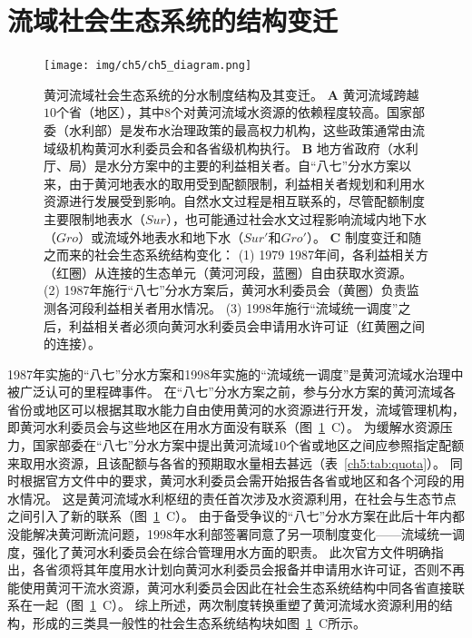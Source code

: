 
\section{流域社会\textendash{}生态系统的结构变迁}\label{results-1}

\begin{figure}[!ht]
	\texttt{[image: img/ch5/ch5\_diagram.png]}
	\caption[黄河流域社会\textendash{}生态系统的分水制度结构及其变迁]{
		黄河流域社会\textendash{}生态系统的分水制度结构及其变迁。
		\textbf{A} 黄河流域跨越$10$个省（地区），其中$8$个对黄河流域水资源的依赖程度较高。国家部委（水利部）是发布水治理政策的最高权力机构，这些政策通常由流域级机构黄河水利委员会和各省级机构执行。
		\textbf{B} 地方省政府（水利厅、局）是水分方案中的主要的利益相关者。自“八七”分水方案以来，由于黄河地表水的取用受到配额限制，利益相关者规划和利用水资源进行发展受到影响。自然水文过程是相互联系的，尽管配额制度主要限制地表水（$Sur$），也可能通过社会水文过程影响流域内地下水（$Gro$）或流域外地表水和地下水（$Sur'$和$Gro'$）。
		\textbf{C} 制度变迁和随之而来的社会\textendash{}生态系统结构变化：
		(1) 1979 \textendash{} 1987年间，各利益相关方（红圈）从连接的生态单元（黄河河段，蓝圈）自由获取水资源。
		(2) 1987年施行“八七”分水方案后，黄河水利委员会（黄圈）负责监测各河段利益相关者用水情况。
		(3) 1998年施行“流域统一调度”之后，利益相关者必须向黄河水利委员会申请用水许可证（红黄圈之间的连接）。}\label{fig:structure}
\end{figure}

1987年实施的“八七”分水方案和1998年实施的“流域统一调度”是黄河流域水治理中被广泛认可的里程碑事件。
在“八七”分水方案之前，参与分水方案的黄河流域各省份或地区可以根据其取水能力自由使用黄河的水资源进行开发，流域管理机构，即黄河水利委员会与这些地区在用水方面没有联系（图~\ref{fig:structure}~C）。
为缓解水资源压力，国家部委在“八七”分水方案中提出黄河流域$10$个省或地区之间应参照指定配额来取用水资源，且该配额与各省的预期取水量相去甚远（表~\ref{ch5:tab:quota}）。
同时根据官方文件中的要求，黄河水利委员会需开始报告各省或地区和各个河段的用水情况。
这是黄河流域水利枢纽的责任首次涉及水资源利用，在社会与生态节点之间引入了新的联系（图~\ref{fig:structure}~C）。
由于备受争议的“八七”分水方案在此后十年内都没能解决黄河断流问题，1998年水利部签署同意了另一项制度变化——流域统一调度，强化了黄河水利委员会在综合管理用水方面的职责。
此次官方文件明确指出，各省须将其年度用水计划向黄河水利委员会报备并申请用水许可证，否则不再能使用黄河干流水资源，黄河水利委员会因此在社会\textendash{}生态系统结构中同各省直接联系在一起（图~\ref{fig:structure}~C）。
综上所述，两次制度转换重塑了黄河流域水资源利用的结构，形成的三类具一般性的社会\textendash{}生态系统结构块如图~\ref{fig:structure}~C所示。


